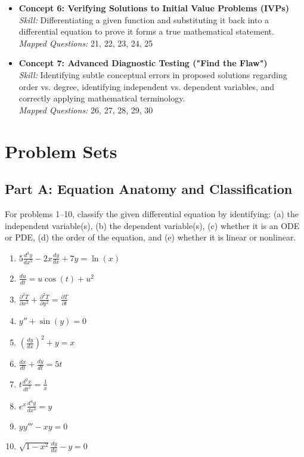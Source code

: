 \documentclass{article}
\begin{document}
\begin{itemize}
    \item \textbf{Concept 6: Verifying Solutions to Initial Value Problems (IVPs)} \\
    \textit{Skill:} Differentiating a given function and substituting it back into a differential equation to prove it forms a true mathematical statement. \\
    \textit{Mapped Questions:} 21, 22, 23, 24, 25
    
    \item \textbf{Concept 7: Advanced Diagnostic Testing ("Find the Flaw")} \\
    \textit{Skill:} Identifying subtle conceptual errors in proposed solutions regarding order vs. degree, identifying independent vs. dependent variables, and correctly applying mathematical terminology. \\
    \textit{Mapped Questions:} 26, 27, 28, 29, 30
\end{itemize}

\newpage

\section{Problem Sets}

\subsection*{Part A: Equation Anatomy and Classification}
For problems 1--10, classify the given differential equation by identifying: 
(a) the independent variable(s), (b) the dependent variable(s), (c) whether it is an ODE or PDE, (d) the order of the equation, and (e) whether it is linear or nonlinear.

\begin{enumerate}
    \item $5 \frac{d^3 y}{dx^3} - 2x \frac{dy}{dx} + 7y = \ln(x)$
    \item $\frac{du}{dt} = u \cos(t) + u^2$
    \item $\frac{\partial^2 T}{\partial x^2} + \frac{\partial^2 T}{\partial y^2} = \frac{\partial T}{\partial t}$
    \item $y'' + \sin(y) = 0$
    \item $\left( \frac{dy}{dx} \right)^2 + y = x$
    \item $\frac{dx}{dt} + \frac{dy}{dt} = 5t$
    \item $t \frac{d^2 x}{dt^2} = \frac{1}{x}$
    \item $e^x \frac{d^4 y}{dx^4} = y$
    \item $y y''' - x y = 0$
    \item $\sqrt{1 - x^2} \frac{dy}{dx} - y = 0$
\end{enumerate}
\end{document}
